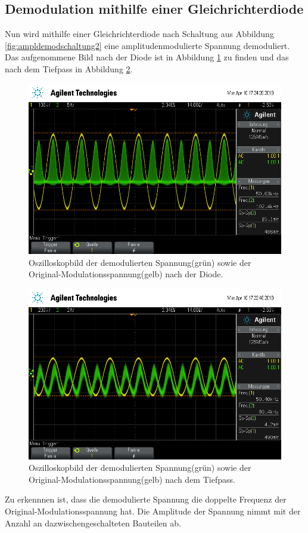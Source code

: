 \subsection{Demodulation mithilfe einer Gleichrichterdiode}

Nun wird mithilfe einer Gleichrichterdiode nach Schaltung aus Abbildung \ref{fig:ampldemodschaltung2} eine amplitudenmodulierte Spannung demoduliert.
Das aufgenommene Bild nach der Diode ist in Abbildung \ref{fig:gnachA} zu finden und das nach dem Tiefpass in Abbildung \ref{fig:gnachTiefpass}.
\begin{figure}[h]
  \centering
  \includegraphics[width=.9\textwidth]{Oszi_Pics/gnachA.png}
  \caption{Oszilloskopbild der demodulierten Spannung(grün) sowie der Original-Modulationsspannung(gelb) nach der Diode.}
  \label{fig:gnachA}
\end{figure}
\begin{figure}[h]
  \centering
  \includegraphics[width=.9\textwidth]{Oszi_Pics/gnachTiefpass.png}
  \caption{Oszilloskopbild der demodulierten Spannung(grün) sowie der Original-Modulationsspannung(gelb) nach dem Tiefpass.}
  \label{fig:gnachTiefpass}
\end{figure}
Zu erkennnen ist, dass die demodulierte Spannung die doppelte Frequenz der Original-Modulationsspannung hat. Die Amplitude der Spannung nimmt mit der Anzahl an dazwischengeschalteten Bauteilen ab.

